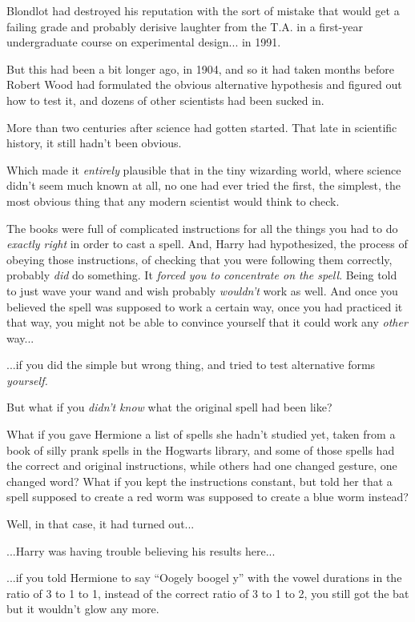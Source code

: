 Blondlot had destroyed his reputation with the sort of mistake that would get a failing grade and probably derisive laughter from the T.A. in a first-year undergraduate course on experimental design... in 1991.

But this had been a bit longer ago, in 1904, and so it had taken months before Robert Wood had formulated the obvious alternative hypothesis and figured out how to test it, and dozens of other scientists had been sucked in.

More than two centuries after science had gotten started. That late in scientific history, it still hadn't been obvious.

Which made it \emph{entirely} plausible that in the tiny wizarding world, where science didn't seem much known at all, no one had ever tried the first, the simplest, the most obvious thing that any modern scientist would think to check.

The books were full of complicated instructions for all the things you had to do \emph{exactly right} in order to cast a spell. And, Harry had hypothesized, the process of obeying those instructions, of checking that you were following them correctly, probably \emph{did} do something. It \emph{forced you to concentrate on the spell}. Being told to just wave your wand and wish probably \emph{wouldn't} work as well. And once you believed the spell was supposed to work a certain way, once you had practiced it that way, you might not be able to convince yourself that it could work any \emph{other} way...

...if you did the simple but wrong thing, and tried to test alternative forms \emph{yourself.}

But what if you \emph{didn't know} what the original spell had been like?

What if you gave Hermione a list of spells she hadn't studied yet, taken from a book of silly prank spells in the Hogwarts library, and some of those spells had the correct and original instructions, while others had one changed gesture, one changed word? What if you kept the instructions constant, but told her that a spell supposed to create a red worm was supposed to create a blue worm instead?

Well, in that case, it had turned out...

...Harry was having trouble believing his results here...

...if you told Hermione to say ``Oogely boogel y'' with the vowel durations in the ratio of 3 to 1 to 1, instead of the correct ratio of 3 to 1 to 2, you still got the bat but it wouldn't glow any more.

